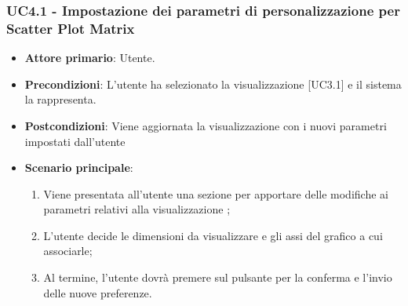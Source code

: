 \subsubsection{UC4.1 - Impostazione dei parametri di personalizzazione per Scatter Plot Matrix}
\begin{itemize}
	\item \textbf{Attore primario}: Utente.
	\item \textbf{Precondizioni}: L'utente ha selezionato la visualizzazione  [UC3.1] e il sistema la rappresenta.
	\item \textbf{Postcondizioni}: Viene aggiornata la visualizzazione  con i nuovi parametri impostati dall'utente
	\item \textbf{Scenario principale}:
	\begin{enumerate}
			\item Viene presentata all'utente una sezione per apportare delle modifiche ai parametri relativi alla visualizzazione ;
			\item L'utente decide le dimensioni da visualizzare e gli assi del grafico a cui associarle;
			\item Al termine, l'utente dovrà premere sul pulsante per la conferma e l'invio delle nuove preferenze.
		\end{enumerate}
\end{itemize}